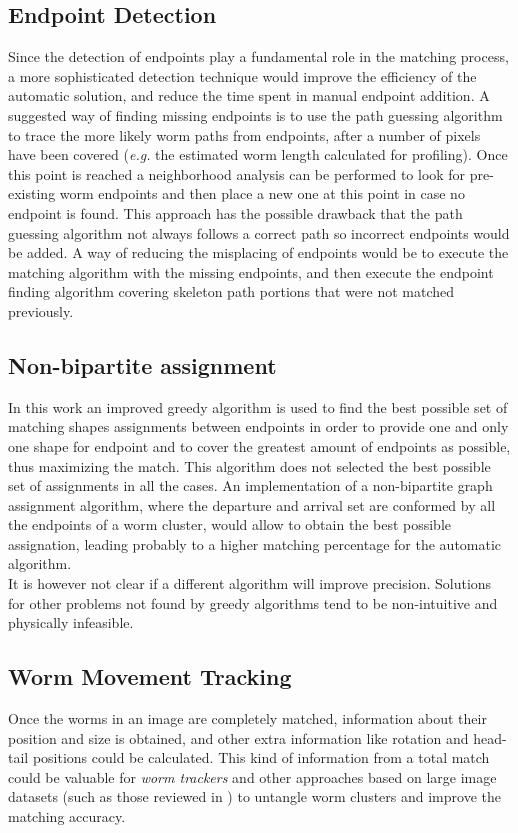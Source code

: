\subsection*{Endpoint Detection}
Since the detection of endpoints play a fundamental role in the matching 
process, a more sophisticated detection technique would improve the 
efficiency of the automatic solution, and reduce the time spent in
manual endpoint addition. A suggested way of finding missing endpoints is
to use the path guessing algorithm to trace the more likely worm paths 
from endpoints, after a number of pixels have been covered (\emph{e.g.} the
estimated worm length calculated for profiling). Once this point is reached
a neighborhood analysis can be performed to look for pre-existing 
worm endpoints and then place a new one at this point in case no endpoint 
is found. This approach has the possible drawback that the path guessing
algorithm not always follows a correct path so incorrect endpoints would
be added. A way of reducing the misplacing of endpoints would be to execute
the matching algorithm with the missing endpoints, and then execute the 
endpoint finding algorithm covering skeleton path portions that were not 
matched previously.

\subsection*{Non-bipartite assignment}
In this work an improved greedy algorithm is used to find the best
possible set of matching shapes assignments between endpoints in order
to provide one and only one shape for endpoint and to cover the greatest
amount of endpoints as possible, thus maximizing the match. This algorithm
does not selected the best possible set of assignments in all the cases. 
An implementation of a non-bipartite graph assignment algorithm, where
the departure and arrival set are conformed by all the endpoints of a worm
cluster, would allow to obtain the best possible assignation, leading
probably to a higher matching percentage for the automatic algorithm.\\

It is however not clear if a different algorithm will improve precision.
Solutions for other problems not found by greedy algorithms tend to be
non-intuitive and physically infeasible.


\subsection*{Worm Movement Tracking}
Once the worms in an image are completely matched, information about their
position and size is obtained, and other extra information like rotation
and head-tail positions could be calculated. This kind of information from a
total match could be valuable for \emph{worm trackers} and other approaches 
based on large image datasets
(such as those reviewed in \cite{automated}) to untangle worm clusters and 
improve the matching accuracy.

